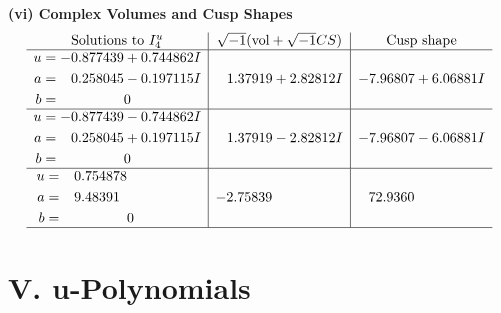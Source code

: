 \documentclass[1p]{elsarticle_modified}
\theoremstyle{definition}
\newcommand{\I}{\sqrt{-1}}
\begin{document}
\newpage\flushleft \textbf{(vi) Complex Volumes and Cusp Shapes}
$$\begin{array}{c|c|c}  
\text{Solutions to }I^u_{4}& \I (\text{vol} + \sqrt{-1}CS) & \text{Cusp shape}\\
 \hline 
\begin{aligned}
u &= -0.877439 + 0.744862 I \\
a &= \phantom{-}0.258045 - 0.197115 I \\
b &= \phantom{-0.000000 } 0\end{aligned}
 & \phantom{-}1.37919 + 2.82812 I & -7.96807 + 6.06881 I \\ \hline\begin{aligned}
u &= -0.877439 - 0.744862 I \\
a &= \phantom{-}0.258045 + 0.197115 I \\
b &= \phantom{-0.000000 } 0\end{aligned}
 & \phantom{-}1.37919 - 2.82812 I & -7.96807 - 6.06881 I \\ \hline\begin{aligned}
u &= \phantom{-}0.754878\phantom{ +0.000000I} \\
a &= \phantom{-}9.48391\phantom{ +0.000000I} \\
b &= \phantom{-0.000000 } 0\end{aligned}
 & -2.75839\phantom{ +0.000000I} & \phantom{-}72.9360\phantom{ +0.000000I}\\
 \hline 
 \end{array}$$\newpage
\newpage\renewcommand{\arraystretch}{1}
\centering \section*{ V. u-Polynomials}
\end{document}
